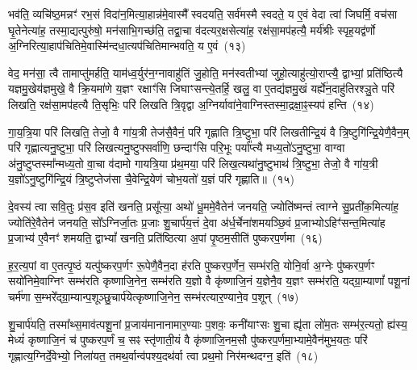 भव॑ति॒ व्यचि॑ष्ठ॒मन्नꣳ॑ रभ॒सं विदा॑न॒मित्या॒हान्न॑मे॒वास्मै᳚ स्वदयति॒ सर्व॑मस्मै स्वदते॒ य ए॒वं वेदा त्वा॑ जिघर्मि॒ वच॑सा घृ॒तेनेत्या॑ह॒ तस्मा॒द्यत्पुरु॑षो॒ मन॑साभि॒गच्छ॑ति॒ तद्वा॒चा व॑दत्यर॒क्षसेत्या॑ह॒ रक्ष॑सा॒मप॑हत्यै॒ मर्य॑श्रीः स्पृह॒यद्व॑र्णो अ॒ग्निरित्या॒हाप॑चितिमे॒वास्मि॑न्दधा॒त्यप॑चितिमान्भवति॒ य ए॒वं~(१३)

वेद॒ मन॑सा॒ त्वै तामाप्तु॑मर्\mbox{}हति॒ याम॑ध्व॒र्युर॑न॒ग्नावाहु॑तिं जु॒होति॒ मन॑स्वतीभ्यां जुहो॒त्याहु॑त्यो॒राप्त्यै॒ द्वाभ्यां॒ प्रति॑ष्ठित्यै यज्ञमु॒खेय॑ज्ञमुखे॒ वै क्रि॒यमा॑णे य॒ज्ञꣳ रक्षाꣳ॑सि जिघाꣳसन्त्ये॒तर्\mbox{}हि॒ खलु॒ वा ए॒तद्य॑ज्ञमु॒खं यर्\mbox{}ह्ये॑न॒दाहु॑तिरश्ञु॒ते परि॑ लिखति॒ रक्ष॑सा॒मप॑हत्यै ति॒सृभिः॒ परि॑ लिखति त्रि॒वृद्वा अ॒ग्निर्यावा॑ने॒वाग्निस्तस्मा॒द्रक्षा॒ꣴ॒स्यप॑ हन्ति~(१४)

गा॒य॒त्रि॒या परि॑ लिखति॒ तेजो॒ वै गा॑य॒त्री तेज॑सै॒वैनं॒ परि॑ गृह्णाति त्रि॒ष्टुभा॒ परि॑ लिखतीन्द्रि॒यं वै त्रि॒ष्टुगि॑न्द्रि॒येणै॒वैन॒म् परि॑ गृह्णात्यनु॒ष्टुभा॒ परि॑ लिखत्यनु॒ष्टुफ्सर्वा॑णि॒ छन्दाꣳ॑सि परि॒भूः पर्या᳚प्त्यै मध्य॒तो॑\-ऽनु॒ष्टुभा॒ वाग्वा अ॑नु॒ष्टुप्तस्मा᳚न्मध्य॒तो वा॒चा व॑दामो गायत्रि॒या प्र॑थ॒मया॒ परि॑ लिख॒त्यथा॑नु॒ष्टुभाथ॑ त्रि॒ष्टुभा॒ तेजो॒ वै गा॑य॒त्री य॒ज्ञो॑\-ऽनु॒ष्टुगि॑न्द्रि॒यं त्रि॒ष्टुप्तेज॑सा चै॒वेन्द्रि॒येण॑ चोभ॒यतो॑ य॒ज्ञं परि॑ गृह्णाति॥~(१५)

{\anuvakamend[{अ॒न्धो᳚\-ऽध्व॒र्युर्म॒हान्भ॑वति त्रि॒ष्टुभा॒ तेजो॒ वै गा॑य॒त्री त्रयो॑दश च}]}%

दे॒वस्य॑ त्वा सवि॒तुः प्र॑स॒व इति॑ खनति॒ प्रसू᳚त्या॒ अथो॑ धू॒ममे॒वैतेन॑ जनयति॒ ज्योति॑ष्मन्तं त्वाग्ने सु॒प्रती॑क॒मित्या॑ह॒ ज्योति॑रे॒वैतेन॑ जनयति॒ सो᳚\-ऽग्निर्जा॒तः प्र॒जाः शु॒चार्प॑य॒त्तं दे॒वा अ॑र्ध॒र्चेना॑शमयञ्छि॒वं प्र॒जाभ्यो\-ऽहिꣳ॑सन्त॒मित्या॑ह प्र॒जाभ्य॑ ए॒वैनꣳ॑ शमयति॒ द्वा\-भ्यां᳚ खनति॒ प्रति॑ष्ठित्या अ॒पां पृ॒ष्ठम॒सीति॑ पुष्करप॒र्णमा~(१६)

ह॒र॒त्य॒पां वा ए॒तत्पृ॒ष्ठं यत्पु॑ष्करप॒र्णꣳ रू॒पेणै॒वैन॒दा ह॑रति पुष्करप॒र्णेन॒ सम्भ॑रति॒ योनि॒र्वा अ॒ग्नेः पु॑ष्करप॒र्णꣳ सयो॑निमे॒वाग्निꣳ सम्भ॑रति कृष्णाजि॒नेन॒ सम्भ॑रति य॒ज्ञो वै कृ॑ष्णाजि॒नं य॒ज्ञेनै॒व य॒ज्ञꣳ सम्भ॑रति॒ यद्ग्रा॒म्याणां᳚ पशू॒नां चर्म॑णा स॒म्भरे᳚द्ग्रा॒म्यान्प॒शूञ्छु॒चार्प॑येत्कृष्णाजि॒नेन॒ सम्भ॑रत्यार॒ण्याने॒व प॒शून्~(१७)

शु॒चार्प॑यति॒ तस्मा᳚थ्स॒माव॑त्पशू॒नां प्र॒जाय॑मानानामार॒ण्याः प॒शवः॒ कनी॑याꣳसः शु॒चा ह्यृ॑ता लो॑म॒तः सम्भ॑र॒त्यतो॒ ह्य॑स्य॒ मेध्यं॑ कृष्णाजि॒नं च॑ पुष्करप॒र्णं च॒ सꣴ स्तृ॑णाती॒यं वै कृ॑ष्णाजि॒नम॒सौ पु॑ष्करप॒र्णमा॒भ्यामे॒वैन॑मुभ॒यतः॒ परि॑ गृह्णात्य॒ग्निर्दे॒वेभ्यो॒ निला॑यत॒ तमथ॒र्वान्व॑पश्य॒दथ॑र्वा त्वा प्रथ॒मो निर॑मन्थदग्न॒ इति॑~(१८)

